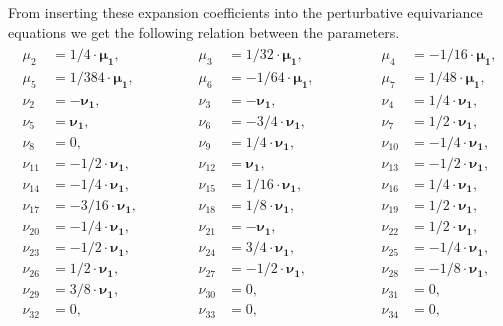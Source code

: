 \documentclass[a4paper,12pt, DIV=14, BCOR=5mm, twoside, headsepline, numbers=noenddot]{scrbook}
\begin{document}
From inserting these expansion coefficients into the perturbative equivariance equations we get the following relation between the parameters.
\begin{align}\label{GRSol}
\begin{alignedat}{3}
\mu_{{2}} &= 1/4\cdot \boldsymbol{\mu_1} , \hspace{2cm}    &  \mu_{{3}}   &= 1/32\cdot \boldsymbol{\mu_1} , \hspace{2cm}   & \mu_{{4}}   &= -1/16\cdot  \boldsymbol{\mu_1} , \\
%
\mu_{{5}} &= 1/384\cdot \boldsymbol{\mu_1} ,  &  \mu_{{6}}   &= -1/64\cdot \boldsymbol{\mu_1} ,  & \mu_{{7}}   &= 1/48\cdot \boldsymbol{\mu_1} , \\
%
\nu_{{2}} &= - \boldsymbol{\nu_1} ,  & \nu_{{3}}   &= - \boldsymbol{\nu_1} ,  & \nu_{{4}}   &= 1/4\cdot \boldsymbol{\nu_1} , \\
%
\nu_{{5}} &= \boldsymbol{\nu_1} ,  & \nu_{{6}}   &= -3/4 \cdot  \boldsymbol{\nu_1} ,   & \nu_{{7}}    &= 1/2\cdot \boldsymbol{\nu_1} , \\
%
\nu_{{8}} &=  0 ,  & \nu_{{9}}   &= 1/4\cdot \boldsymbol{\nu_1} ,   & \nu_{{10}}    &= -1/4 \cdot  \boldsymbol{\nu_1} , \\
%
\nu_{{11}} &= -1/2\cdot \boldsymbol{\nu_1} ,  &  \nu_{{12}}   &= \boldsymbol{\nu_1} ,   & \nu_{{13}}    &= -1/2\cdot \boldsymbol{\nu_1} , \\
%
\nu_{{14}} &= -1/4\cdot \boldsymbol{\nu_1} ,  &  \nu_{{15}}   &= 1/16\cdot \boldsymbol{\nu_1} ,   & \nu_{{16}}    &= 1/4\cdot \boldsymbol{\nu_1} , \\
%
\nu_{{17}} &= -3/16\cdot \boldsymbol{\nu_1} ,  &  \nu_{{18}}   &= 1/8\cdot \boldsymbol{\nu_1} ,   & \nu_{{19}}    &= 1/2\cdot \boldsymbol{\nu_1} , \\
%
\nu_{{20}} &= -1/4\cdot \boldsymbol{\nu_1} ,  & \nu_{{21}}   &= - \boldsymbol{\nu_1} ,   & \nu_{{22}}    &= 1/2\cdot \boldsymbol{\nu_1} , \\
%
\nu_{{23}} &= -1/2\cdot \boldsymbol{\nu_1} ,  & \nu_{{24}}   &= 3/4\cdot \boldsymbol{\nu_1} ,   & \nu_{{25}}    &= -1/4\cdot \boldsymbol{\nu_1} , \\
%
\nu_{{26}} &= 1/2\cdot \boldsymbol{\nu_1} ,  & \nu_{{27}}   &= -1/2\cdot \boldsymbol{\nu_1} ,   & \nu_{{28}}    &= -1/8\cdot \boldsymbol{\nu_1} , \\
%
\nu_{{29}} &= 3/8\cdot \boldsymbol{\nu_1} ,  & \nu_{{30}}   &=0 ,   & \nu_{{31}}    &= 0 , \\
%
\nu_{{32}} &= 0 ,  & \nu_{{33}}   &= 0 ,   &  \nu_{{34}}    &=  0 , \\

\end{alignedat}
\end{align}
\end{document}
